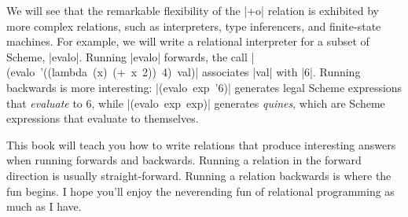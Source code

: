 We will see that the remarkable flexibility of the \scheme|+o|
relation is exhibited by more complex relations, such as interpreters,
type inferencers, and finite-state machines.
%
For example, we will write a relational interpreter for a subset
of Scheme, \scheme|evalo|. Running \scheme|evalo| forwards, the call
\mbox{\scheme|(evalo '((lambda (x) (+ x 2)) 4) val)|} associates
\scheme|val| with \schemeresult|6|. Running 
backwards is more interesting: \mbox{\scheme|(evalo exp '6)|} generates legal
Scheme expressions that \emph{evaluate} to 6, while
\mbox{\scheme|(evalo exp exp)|} generates \emph{quines}, which are Scheme expressions that evaluate to themselves.


This book will teach you how to write relations that produce
interesting answers when running forwards and backwards.
%
Running a relation in the forward direction is usually straight-forward.
%
Running a relation backwards is where the fun begins.
%
I hope you'll enjoy the neverending fun of relational programming as
much as I have.





